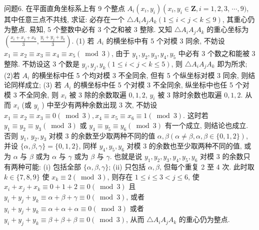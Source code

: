 问题6. 在平面直角坐标系上有 9 个整点 $A_i\left(x_i, y_i\right)\left(x_i, y_i \in \mathbf{Z}, i=1,2,3\right.$, $\cdots, 9)$, 其中任意三点不共线, 求证: 必存在一个 $\triangle A_i A_j A_k(1 \leqslant i<j<k \leqslant 9)$, 其重心仍为整点.
易知, 5 个整数中必有 3 个之和被 3 整除.
又知 $\triangle A_i A_j A_k$ 的重心坐标为 $\left(\frac{x_i+x_j+x_k}{3}, \frac{y_i+y_j+y_k}{3}\right)$. (1) 若 $A_i$ 的横坐标中有 5 个对模 3 同余, 不妨设 $x_1 \equiv x_2 \equiv x_3 \equiv x_4 \equiv x_5(\bmod 3)$, 由于 $y_1, y_2, y_3, y_4, y_5$ 中必有 3 个数之和能被 3 整除.
不妨设这 3 个数是 $y_i, y_j, y_k(1 \leqslant i<j<k \leqslant 5)$, 则 $\triangle A_i A_j A_k$ 即为所求; (2)若 $A_i$ 的横坐标中任 5 个均对模 3 不全同余, 但有 5 个纵坐标对模 3 同余, 则结论同样成立; (3) 若 $A_i$ 的横坐标中任 5 个对模 3 不全同余, 纵坐标中也任 5 个对模 3 不全同余, 则 $x_i$ 被 3 除的余数取遍 $0,1,2$, $y_i$ 被 3 除时余数也取遍 $0,1,2$. 从而 $x_i$ (或 $y_i$ ) 中至少有两种余数出现 3 次, 不妨设 $x_1 \equiv x_2 \equiv x_3 \equiv 0(\bmod 3), x_4 \equiv x_5 \equiv x_6 \equiv 1(\bmod 3)$. 这时若 $y_1 \equiv y_2 \equiv y_3(\bmod 3)$ 或 $y_4 \equiv y_5 \equiv y_6(\bmod 3)$ 有一个成立, 则结论也成立.
否则 $y_1$, $y_2, y_3$ 对模 3 的余数至少取两种不同的值 $\alpha, \beta(\alpha \neq \beta, \alpha, \beta \in\{0,1,2\})$, 并设 $\{\alpha, \beta, \gamma\}=\{0,1,2\}$, 同样 $y_4, y_5, y_6$ 对模 3 的余数也至少取两种不同的值, 或为 $\alpha$ 与 $\beta$ 或为 $\alpha$ 与 $\gamma$ 或为 $\beta$ 与 $\gamma$. 也就是说 $y_1, y_2, y_3, y_4, y_5, y_6$ 对模 3 的余数只有两种可能: (i) 包括全部 $\{\alpha, \beta, \gamma\}$; (ii) 只包括 $\alpha, \beta$, 但每个重复 2 至 4 次.
此时取 $k \in\{7,8,9\}$ 使 $x_k \equiv 2(\bmod 3)$, 则存在 $1 \leqslant i \leqslant 3<j \leqslant 6$, 使 $x_i+x_j+x_k \equiv 0+1+2 \equiv 0(\bmod 3)$ 且 $y_i+y_j+y_k \equiv \alpha+\beta+\gamma \equiv 0(\bmod 3)$, 或者 $y_i+y_j+y_k \equiv \alpha+\alpha+\alpha \equiv 0(\bmod 3)$ 或者 $y_i+y_j+y_k \equiv \beta+\beta+\beta \equiv 0(\bmod 3)$, 从而 $\triangle A_i A_j A_k$ 的重心仍为整点.



